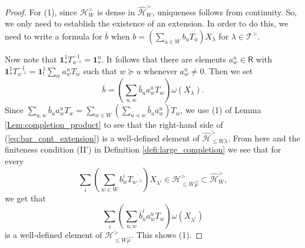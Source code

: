 \documentclass{amsart}
\newcommand{\Hecke}{\mathcal{H}}
\newcommand{\Ring}{\mathsf{R}}
\newcommand{\bone}{\mathbf{1}}
\theoremstyle{definition}
\numberwithin{equation}{section}
\begin{document}
\begin{proof}
For (1), since $\Hecke_W^{>}$ is dense in $\widehat{\Hecke}_W^{>}$, uniqueness follows from continuity. So, we only need to establish the existence of an extension. In order to do this, we need to write a formula for $\bar{b}$ when $b=(\sum_{u\in W}b_uT_u)X_\lambda$ for $\lambda\in \mathcal{T}^>$. %

Now note that $\bone_*^1 T_{u^{-1}}^{-1}=\bone_*^u$. It follows that there are elements $a_w^u\in \Ring$ with $\bone_*^1 T_{u^{-1}}^{-1}= \bone_!^1\sum_{w} a_w^u T_w$ such that $w\succeq u$ whenever $a_{w}^u\neq 0$. Then we set
\begin{equation}\label{eq:bar_cont_extension}
\bar{b}=(\sum_{u,w}\bar{b}_u a_w^u T_w) \omega(X_{\lambda}).
\end{equation}
Since $\sum_{u,w}\bar{b}_u a_w^u T_w=\sum_{w\in W}(\sum_{u\preceq w}\bar{b}_u a_w^u)T_w$,  we use (1) of Lemma \ref{Lem:completion_product} to see that the right-hand side of (\ref{eq:bar_cont_extension}) is a well-defined element of $\widehat{\Hecke}_{\leqslant W\lambda}^{>}$. From here and the finiteness condition (II') in Definition \ref{defi:large_completion} we see that for every $$\sum_{i} (\sum_{w\in W}b^i_w T_{{w}^{-1}})X_{\lambda^i}\in \Hecke^>_{\leqslant W\vec{\mu}}\subset\widehat{\Hecke}_W^{>},$$ we get that
$$\sum_i(\sum_{u,w}\bar{b}^i_u a_w^u T_w) \omega(X_{\lambda^i})$$
is a well-defined element of $\Hecke^>_{\leqslant W\vec{\mu}}$. This shows (1).


\end{proof}
\end{document}
